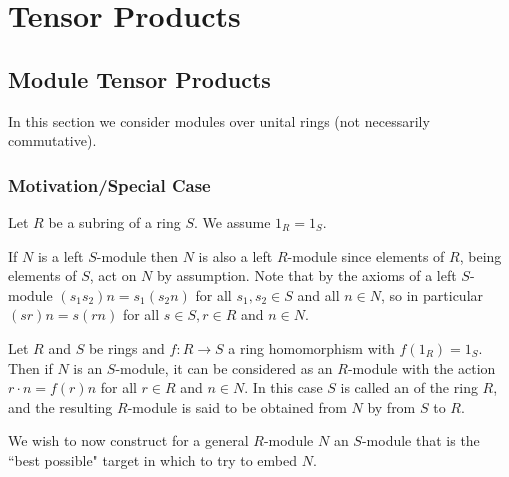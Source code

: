 \chapter{ Tensor Products}
\label{TensorProd}

\section{ Module Tensor Products}

In this section we consider modules over unital rings (not necessarily commutative).

\subsection{Motivation/Special Case}

Let $R$ be a subring of a ring $S$. We assume $1_R = 1_S$.

If $N$ is a left $S$-module then $N$ is also a left $R$-module since elements of $R$, being elements of $S$, act on $N$ by assumption. Note that by the axioms of a left $S$-module $(s_1s_2)n = s_1(s_2n)$ for all $s_1,s_2 \in S$ and all $n \in N$, so in particular $(sr)n = s(rn)$ for all $s \in S, r \in R$ and $n \in N$.

\begin{definition}
    Let $R$ and $S$ be rings and $f:R\rightarrow S$ a ring homomorphism with $f(1_R) = 1_S$. Then if $N$ is an $S$-module, it can be considered as an $R$-module with the action $r\cdot n = f(r)n$ for all $r \in R$ and $n\in N$. In this case $S$ is called an  of the ring $R$, and the resulting $R$-module is said to be obtained from $N$ by  from $S$ to $R$.
\end{definition}

We wish to now construct for a general $R$-module $N$ an $S$-module that is the ``best possible" target in which to try to embed $N$.

